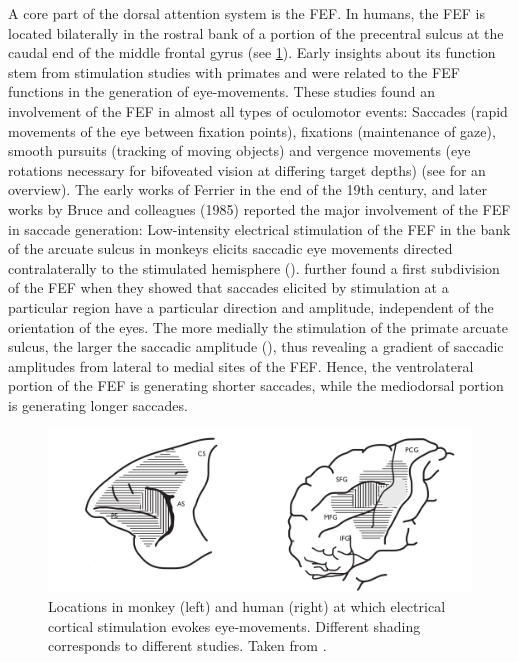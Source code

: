 \documentclass[a4paper, 12pt]{scrreprt}
\begin{document}
A core part of the dorsal attention system is the FEF. In humans, the FEF is located bilaterally in the rostral bank of a portion of the precentral sulcus at the caudal end of the middle frontal gyrus (see \ref{fig:FEF}). Early insights about its function stem from stimulation studies with primates and were related to the FEF functions in the generation of eye-movements. These studies found an involvement of the FEF in almost all types of oculomotor events: Saccades (rapid movements of the eye between fixation points), fixations (maintenance of gaze), smooth pursuits (tracking of moving objects) and vergence movements (eye rotations necessary for bifoveated vision at differing target depths) (see \textcite{krauzlis2014eye} for an overview). The early works of Ferrier in the end of the 19th century, and later works by Bruce and colleagues (1985) reported the major involvement of the FEF in saccade generation: Low-intensity electrical stimulation of the FEF in the bank of the arcuate sulcus in monkeys elicits saccadic eye movements directed contralaterally to the stimulated hemisphere (\cite{tehovnik2000eye}). \textcite{bruce1985primate} further found a first subdivision of the FEF when they showed that saccades elicited by stimulation at a particular region have a particular direction and amplitude, independent of the orientation of the eyes. The more medially the stimulation of the primate arcuate sulcus, the larger the saccadic amplitude (\cite{bruce1985primate}), thus revealing a gradient of saccadic amplitudes from lateral to medial sites of the FEF. Hence, the ventrolateral portion of the FEF is generating shorter saccades, while the mediodorsal portion is generating longer saccades. 

\begin{figure}[H]
	\includegraphics[scale=0.3]{img/FEF.png}
	\caption[Anatomical location of the FEF]{\small{Locations in monkey (left) and human (right) at which electrical cortical stimulation evokes eye-movements. Different shading corresponds to different studies. Taken from \textcite{blanke2000FEF}.}}
	\label{fig:FEF}
\end{figure}
\end{document}

